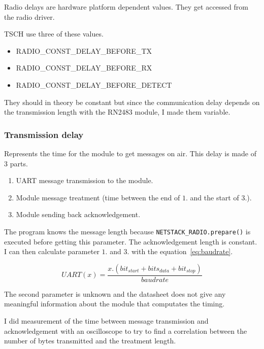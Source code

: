 Radio delays are hardware platform dependent values. 
They get accessed from the radio driver.

TSCH use three of these values.

\begin{itemize}
  \item RADIO\_CONST\_DELAY\_BEFORE\_TX
  \item RADIO\_CONST\_DELAY\_BEFORE\_RX
  \item RADIO\_CONST\_DELAY\_BEFORE\_DETECT
\end{itemize}

They should in theory be constant but since the communication delay depends
on the transmission length with the RN2483 module, I made them variable.


\subsubsection{Transmission delay}

Represents the time for the module to get messages on air. 
This delay is made of 3 parts.

\begin{enumerate}
  \item UART message transmission to the module.
  \item Module message treatment (time between the end of $1.$ and the start of $3.$).
  \item Module sending back acknowledgement.
\end{enumerate}

The program knows the message length because
\lstinline{NETSTACK_RADIO.prepare()} is executed before getting this parameter.
The acknowledgement length is constant. 
I can then calculate parameter $1.$ and $3.$ with the equation~\ref{eq:baudrate}.

\begin{equation}
  \label{eq:baudrate}
  UART(x) = \frac{x . (bit_{start} + bits_{data} + bit_{stop})}{baudrate}
\end{equation}

The second parameter is unknown and the datasheet does not give any meaningful
information about the module that computates the timing.

I did measurement of the time between message transmission and acknowledgement
with an oscilloscope to try to find a correlation between the number of bytes
transmitted and the treatment length.

